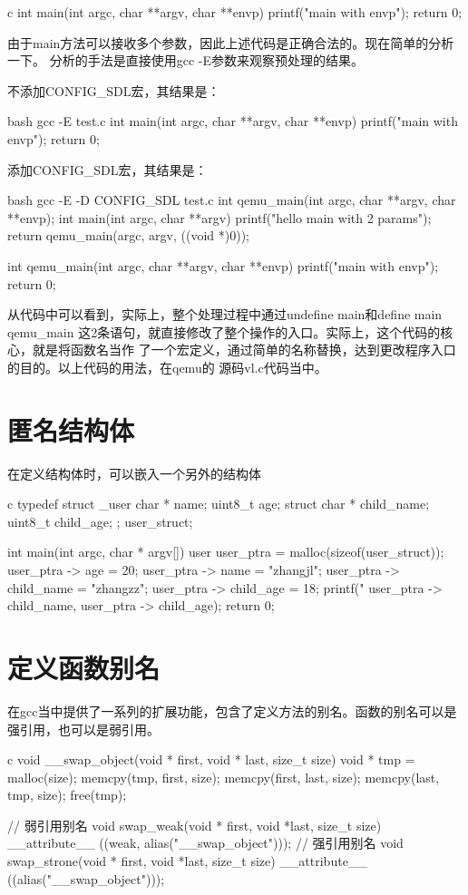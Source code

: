 \begin{outline}[enumerate]
\begin{code-in-enumerate}{c}
int main(int argc, char **argv, char **envp)
{
    printf("main with envp\n");
    return 0;
}
\end{code-in-enumerate}
由于main方法可以接收多个参数，因此上述代码是正确合法的。现在简单的分析一下。
分析的手法是直接使用gcc -E参数来观察预处理的结果。

不添加CONFIG\_SDL宏，其结果是：
\begin{code-in-enumerate}{bash}
gcc -E test.c
int main(int argc, char **argv, char **envp)
{
    printf("main with envp\n");
    return 0;
}
\end{code-in-enumerate}
添加CONFIG\_SDL宏，其结果是：
\begin{code-in-enumerate}{bash}
gcc -E -D CONFIG_SDL test.c
int qemu_main(int argc, char **argv, char **envp);
int main(int argc, char **argv)
{
    printf("hello main with 2 params\n");
    return qemu_main(argc, argv, ((void *)0));
}

int qemu_main(int argc, char **argv, char **envp)
{
    printf("main with envp\n");
    return 0;
}
\end{code-in-enumerate}
从代码中可以看到，实际上，整个处理过程中通过undefine main和define main qemu\_main
这2条语句，就直接修改了整个操作的入口。实际上，这个代码的核心，就是将函数名当作
了一个宏定义，通过简单的名称替换，达到更改程序入口的目的。以上代码的用法，在qemu的
源码vl.c代码当中。
\end{outline}

\section{匿名结构体}
在定义结构体时，可以嵌入一个另外的结构体
\begin{code-block}{c}
typedef struct _user {
    char * name;
    uint8_t age;
    struct {
        char * child_name;
        uint8_t child_age;
    };
}user_struct;

int main(int argc, char * argv[])
{
    user user_ptra = malloc(sizeof(user_struct));
    user_ptra -> age = 20;
    user_ptra -> name = "zhangjl";
    user_ptra -> child_name = "zhangzz";
    user_ptra -> child_age = 18;
    printf("%
           user_ptra -> child_name, user_ptra -> child_age);
    return 0;
}
\end{code-block}

\section{定义函数别名}
在gcc当中提供了一系列的扩展功能，包含了定义方法的别名。函数的别名可以是强引用，也可以是弱引用。
\begin{code-block}{c}
void __swap_object(void * first, void * last, size_t size)
{
    void * tmp = malloc(size);
    memcpy(tmp, first, size);
    memcpy(first, last, size);
    memcpy(last, tmp, size);
    free(tmp);
}

// 弱引用别名
void swap_weak(void * first, void *last, size_t size)
        __attribute__ ((weak, alias("__swap_object")));
// 强引用别名
void swap_strone(void * first, void *last, size_t size)
        __attribute__ ((alias("__swap_object")));
\end{code-block}

